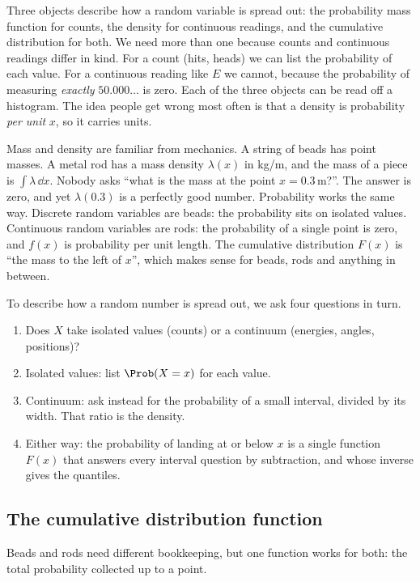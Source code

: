Three objects describe how a random variable is spread out: the probability
mass function for counts, the density for continuous readings, and the
cumulative distribution for both. We need more than one because counts and
continuous readings differ in kind. For a count (hits, heads) we can list the
probability of each value. For a continuous reading like $E$ we cannot,
because the probability of measuring \emph{exactly} $50.000\ldots$ is zero.
Each of the three objects can be read off a histogram. The idea people get
wrong most often is that a density is probability \emph{per unit} $x$, so it
carries units.

Mass and density are familiar from mechanics. A string of beads has point masses. A metal rod has a mass density
$\lambda(x)$ in kg/m, and the mass of a piece is $\int\lambda\,\dd x$. Nobody
asks ``what is the mass at the point $x=0.3\,$m?''. The answer is zero, and
yet $\lambda(0.3)$ is a perfectly good number. Probability works the same
way. Discrete random variables are beads: the probability sits on isolated
values. Continuous random variables are rods: the probability of a single
point is zero, and $f(x)$ is probability per unit length. The cumulative
distribution $F(x)$ is ``the mass to the left of $x$'', which makes sense for
beads, rods and anything in between.

To describe how a random number is spread out, we ask four questions in turn.
\begin{enumerate}[leftmargin=1.5em,itemsep=1pt]
  \item Does $X$ take isolated values (counts) or a continuum (energies,
        angles, positions)?
  \item Isolated values: list $\Prob(X=x)$ for each value.
  \item Continuum: ask instead for the probability of a small interval,
        divided by its width. That ratio is the density.
  \item Either way: the probability of landing at or below $x$ is a single
        function $F(x)$ that answers every interval question by subtraction,
        and whose inverse gives the quantiles.
\end{enumerate}

\subsection{The cumulative distribution function}

Beads and rods need different bookkeeping, but one function works for both:
the total probability collected up to a point.

